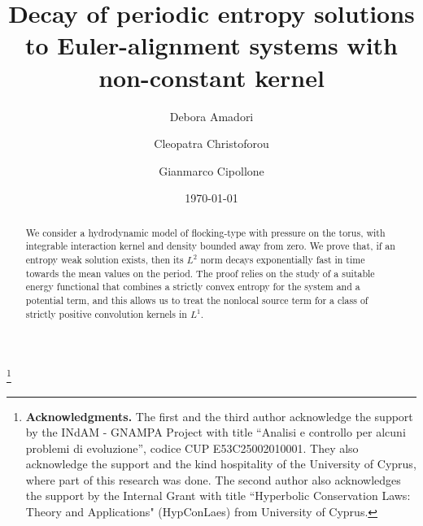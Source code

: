 \documentclass[10pt,reqno]{amsart}
\begin{document}

\title[Decay of entropy solutions to Euler-alignment systems]{%
Decay of periodic entropy solutions to Euler-alignment systems with non-constant kernel
}

\author%
{Debora Amadori}
\address{\newline 
Dipartimento di Ingegneria e Scienze dell'Informazione e Matematica (DISIM), University of L'Aquila -- L'Aquila, Italy}

\author%
{Cleopatra Christoforou}
\address{\newline Department of Mathematics and Statistics, University of Cyprus -- Nicosia, Cyprus}


\author%
{Gianmarco Cipollone}
\address{\newline 
Dipartimento di Ingegneria e Scienze dell'Informazione e Matematica (DISIM), University of L'Aquila -- L'Aquila, Italy}

\date{\today}

 


\thanks{\textbf{Acknowledgments.} The first and the third author acknowledge the support by the INdAM - GNAMPA Project with title “Analisi e controllo per alcuni problemi di evoluzione”, codice CUP E53C25002010001. They also acknowledge the support and the kind hospitality of the University of Cyprus, where part of this research was done. The second author also acknowledges the support by the Internal Grant with title ``Hyperbolic Conservation Laws: Theory and Applications" (HypConLaes) from University of Cyprus.}

\begin{abstract}
We consider a hydrodynamic model of flocking-type with pressure on the torus, with integrable interaction kernel 
and density bounded away from zero. We prove that, if an entropy weak solution exists, 
then its $L^2$ norm decays exponentially fast in time towards the mean values on the period. 
The proof relies on the study of a suitable energy functional that combines a strictly convex entropy for the system 
and a potential term, and this allows us to treat the nonlocal source term for a class of strictly positive convolution kernels in $L^1$.
\end{abstract}
\end{document}
